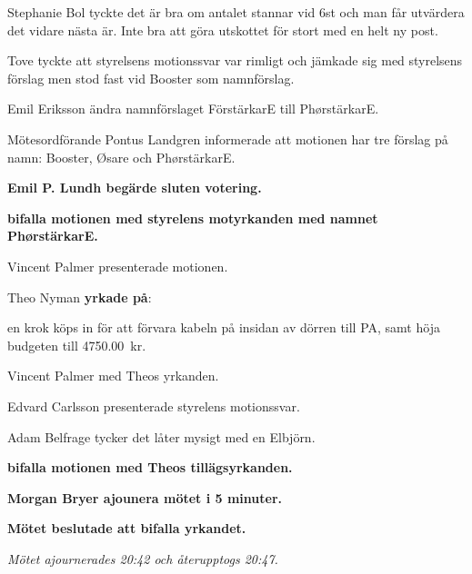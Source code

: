 \documentclass[10pt]{article}
\begin{document}
\begin{paragrafer}
\begin{paragrafer}
      Stephanie Bol tyckte det är bra om antalet stannar vid 6st och man får utvärdera det vidare nästa är. Inte bra att göra utskottet för stort med en helt ny post. 

      

      Tove tyckte att styrelsens motionssvar var rimligt och jämkade sig med styrelsens förslag men stod fast vid Booster som namnförslag. 

      Emil Eriksson \ypa ändra namnförslaget FörstärkarE till PhørstärkarE.

      Mötesordförande Pontus Landgren informerade att motionen har tre förslag på namn: Booster, Øsare och PhørstärkarE.

      \textbf{Emil P. Lundh begärde sluten votering.} 

      \textbf{\Mba bifalla motionen med styrelens motyrkanden med namnet PhørstärkarE.}



      Vincent Palmer presenterade motionen. 

      Theo Nyman \textbf{yrkade på}:
      \begin{attsatser}
        \att en krok köps in för att förvara kabeln på insidan av dörren till PA, samt
        \att höja budgeten till \SI{4750,00}{kr}.
      \end{attsatser} 
      
      Vincent Palmer \js med Theos yrkanden. 

      Edvard Carlsson presenterade styrelens motionssvar. 

      Adam Belfrage tycker det låter mysigt med en Elbjörn. 

      \textbf{\Mba bifalla motionen med Theos tillägsyrkanden.}

      \textbf{Morgan Bryer \ypa ajounera mötet i 5 minuter.}
      
      \textbf{Mötet beslutade att bifalla yrkandet.}
      
      \textit{Mötet ajournerades 20:42 och återupptogs 20:47.}


\end{paragrafer}
\end{paragrafer}
\end{document}
